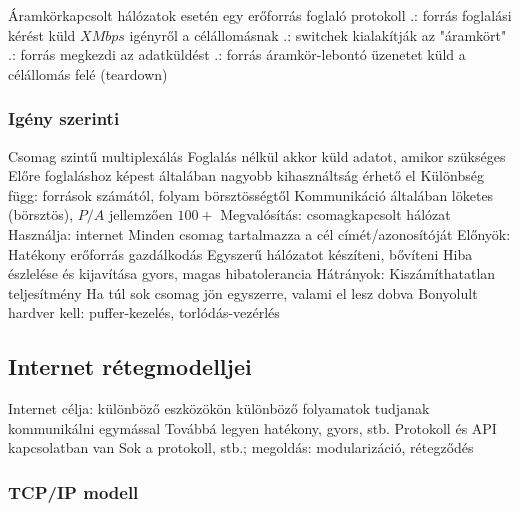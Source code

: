 \documentclass[12pt,a4paper]{article}
\begin{document}
\begin{outline}
	\1 Áramkörkapcsolt hálózatok esetén egy erőforrás foglaló protokoll
	.: forrás foglalási kérést küld $X Mbps$ igényről a célállomásnak
	.: switchek kialakítják az "áramkört"
	.: forrás megkezdi az adatküldést
	.: forrás áramkör-lebontó üzenetet küld a célállomás felé (teardown)
\end{outline}

\pagebreak

\subsubsection{Igény szerinti}

\begin{outline}
	\1 Csomag szintű multiplexálás
	\1 Foglalás nélkül akkor küld adatot, amikor szükséges
	\1 Előre foglaláshoz képest általában nagyobb kihasználtság érhető el
		\2 Különbség függ: források számától, folyam börsztösségtől
		\2 Kommunikáció általában löketes (börsztös), $P/A$ jellemzően $100+$
	\1 Megvalósítás: csomagkapcsolt hálózat
		\2 Használja: internet
		\2 Minden csomag tartalmazza a cél címét/azonosítóját
	\1 Előnyök:
		\2 Hatékony erőforrás gazdálkodás
		\2 Egyszerű hálózatot készíteni, bővíteni
		\2 Hiba észlelése és kijavítása gyors, magas hibatolerancia
	\1 Hátrányok:
		\2 Kiszámíthatatlan teljesítmény
			\2 Ha túl sok csomag jön egyszerre, valami el lesz dobva
		\2 Bonyolult hardver kell: puffer-kezelés, torlódás-vezérlés
\end{outline}

\pagebreak

\subsection{Internet rétegmodelljei}

\begin{outline}
	\1 Internet célja: különböző eszközökön különböző folyamatok tudjanak kommunikálni egymással
	\2 Továbbá legyen hatékony, gyors, stb.
	\1 Protokoll és API kapcsolatban van
	\1 Sok a protokoll, stb.; megoldás: modularizáció, rétegződés
\end{outline}

\subsubsection{TCP/IP modell}
\end{document}
